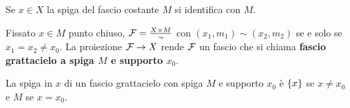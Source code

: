 \begin{example}
Se $x\in X$ la spiga del fascio costante $M$ si identifica con $M$.
\end{example}

\begin{definition}
Fissato $x\in M$ punto chiuso, $\mathcal{F}=\frac{X\times M}{\sim}$ con $(x_1,m_1)\sim (x_2,m_2)$ se e solo se $x_1=x_2\neq x_0$. La proiezione $\mathcal{F}\to X$ rende $\mathcal{F}$ un fascio che si chiama \textbf{fascio grattacielo a spiga $M$ e supporto $x_0$}.
\end{definition}

\begin{example}
La spiga in $x$ di un fascio grattacielo con spiga $M$ e supporto $x_0$ \`e $\left\{{x}\right\}$ se $x\neq x_0$ e $M$ se $x=x_0$.
\end{example}

















